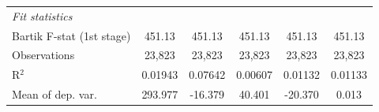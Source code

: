 \begin{tabular}{lccccc}
   \midrule
   \emph{Fit statistics}\\
   Bartik F-stat (1st stage)                                     & 451.13                            & 451.13                                   & 451.13                          & 451.13                                & 451.13\\  
   Observations                                                          & 23,823                            & 23,823                                   & 23,823                          & 23,823                                & 23,823\\  
   R$^2$                                                                 & 0.01943                           & 0.07642                                  & 0.00607                         & 0.01132                               & 0.01133\\  
   Mean of dep. var.                                                     & 293.977                           & -16.379                                  & 40.401                          & -20.370                               & 0.013\\  
\bottomrule
\end{tabular}
